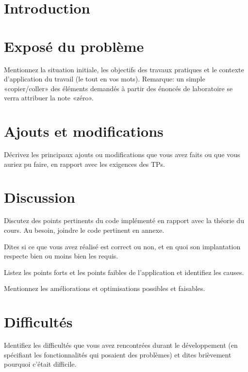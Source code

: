 \documentclass[10pt,a4paper]{article}
\begin{document}
\newpage

\hfill

\newpage

\tableofcontents

\newpage

\section{Introduction}


\section{Exposé du problème}

\og Mentionnez la situation initiale, les objectifs des travaux pratiques et le contexte d'application du travail (le tout en vos mots). Remarque: un simple «copier/coller» des éléments demandés à partir des énoncés de laboratoire se verra attribuer la note «zéro». \fg

\section{Ajouts et modifications}

\og Décrivez les principaux ajouts ou modifications que vous avez faits ou que vous auriez pu faire, en rapport avec les exigences des TPs. \fg

\section{Discussion}

\og
    Discutez des points pertinents du code implémenté en rapport avec la théorie du cours. Au besoin, joindre le code pertinent en annexe.
    
    Dites si ce que vous avez réalisé est correct ou non, et en quoi son implantation respecte bien ou moins bien les requis.
    
    Listez les points forts et les points faibles de l'application et identifiez les causes.
    
    Mentionnez les améliorations et optimisations possibles et faisables.
\fg

\section{Difficultés}

\og 

    Identifiez les difficultés que vous avez rencontrées durant le développement (en spécifiant les fonctionnalités qui posaient des problèmes) et dites brièvement pourquoi c'était difficile.
    
\end{document}
